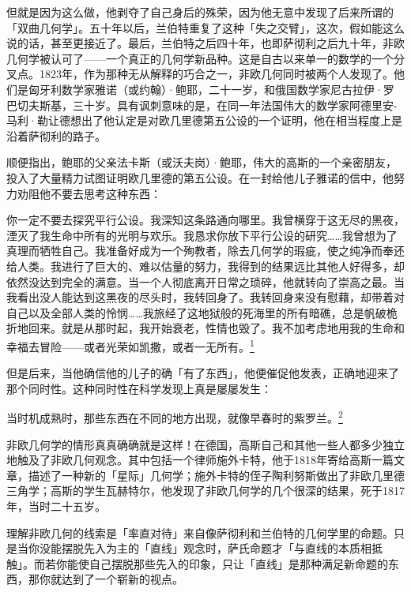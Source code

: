 \documentclass[
  12pt,
  twoside,
  openright,
  oldfontcommands,
]{memoir}
\newenvironment{fsquote}{%
  \begin{mdframed}[style=gebquote]\kaitifamily\small%
}{%
  \end{mdframed}%
}
\begin{document}
但就是因为这么做，他剥夺了自己身后的殊荣，因为他无意中发现了后来所谓的「双曲几何学」。五十年以后，兰伯特重复了这种「失之交臂」，这次，假如能这么说的话，甚至更接近了。最后，兰伯特之后四十年，也即萨彻利之后九十年，非欧几何学被认可了------一个真正的几何学新品种。这是自古以来单一的数学的一个分叉点。1823年，作为那种无从解释的巧合之一，非欧几何同时被两个人发现了。他们是匈牙利数学家雅诺（或约翰）·鲍耶，二十一岁，和俄国数学家尼古拉伊·罗巴切夫斯基，三十岁。具有讽刺意味的是，在同一年法国伟大的数学家阿德里安-马利·勒让德想出了他认定是对欧几里德第五公设的一个证明，他在相当程度上是沿着萨彻利的路子。

顺便指出，鲍耶的父亲法卡斯（或沃夫岗）·鲍耶，伟大的高斯的一个亲密朋友，投入了大量精力试图证明欧几里德的第五公设。在一封给他儿子雅诺的信中，他努力劝阻他不要去思考这种东西：

\begin{fsquote}
你一定不要去探究平行公设。我深知这条路通向哪里。我曾横穿于这无尽的黑夜，湮灭了我生命中所有的光明与欢乐。我恳求你放下平行公设的研究\ldots\ldots 我曾想为了真理而牺牲自己。我准备好成为一个殉教者，除去几何学的瑕疵，使之纯净而奉还给人类。我进行了巨大的、难以估量的努力，我得到的结果远比其他人好得多，却依然没达到完全的满意。当一个人彻底离开日常之琐碎，他就转向了崇高之最。当我看出没人能达到这黑夜的尽头时，我转回身了。我转回身来没有慰藉，却带着对自己以及全部人类的怜悯\ldots\ldots 我旅经了这地狱般的死海里的所有暗礁，总是帆破桅折地回来。就是从那时起，我开始衰老，性情也毁了。我不加考虑地用我的生命和幸福去冒险------或者光荣如凯撒，或者一无所有。\hyperref[fn:Chapter04-1]{\textsuperscript{1}}
\end{fsquote}

但是后来，当他确信他的儿子的确「有了东西」，他便催促他发表，正确地迎来了那个同时性。这种同时性在科学发现上真是屡屡发生：

\begin{fsquote}
当时机成熟时，那些东西在不同的地方出现，就像早春时的紫罗兰。\hyperref[fn:Chapter04-2]{\textsuperscript{2}}
\end{fsquote}

非欧几何学的情形真真确确就是这样！在德国，高斯自己和其他一些人都多少独立地触及了非欧几何观念。其中包括一个律师施外卡特，他于1818年寄给高斯一篇文章，描述了一种新的「星际」几何学；施外卡特的侄子陶利努斯做出了非欧几里德三角学；高斯的学生瓦赫特尔，他发现了非欧几何学的几个很深的结果，死于1817年，当时二十五岁。

理解非欧几何的线索是「率直对待」来自像萨彻利和兰伯特的几何学里的命题。只是当你没能摆脱先入为主的「直线」观念时，萨氏命题才「与直线的本质相抵触」。而若你能使自己摆脱那些先入的印象，只让「直线」是那种满足新命题的东西，那你就达到了一个崭新的视点。
\end{document}
